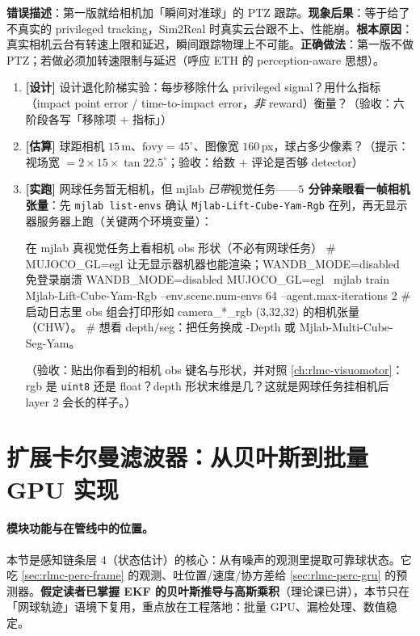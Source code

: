 \begin{pitfall}
\textbf{错误描述}：第一版就给相机加「瞬间对准球」的 PTZ 跟踪。\textbf{现象后果}：等于给了不真实的 privileged tracking，Sim2Real 时真实云台跟不上、性能崩。\textbf{根本原因}：真实相机云台有转速上限和延迟，瞬间跟踪物理上不可能。\textbf{正确做法}：第一版不做 PTZ；若做必须加转速限制与延迟（呼应 ETH 的 perception-aware 思想）。
\end{pitfall}

\begin{practice}[本节动手任务]
\begin{enumerate}
  \item \textbf{[设计]} 设计退化阶梯实验：每步移除什么 privileged signal？用什么指标（impact point error / time-to-impact error，\emph{非} reward）衡量？（验收：六阶段各写「移除项 $+$ 指标」）
  \item \textbf{[估算]} 球距相机 $15$\,m、$\mathrm{fovy}=45^\circ$、图像宽 $160$\,px，球占多少像素？（提示：视场宽 $=2\times 15\times\tan 22.5^\circ$；验收：给数 $+$ 评论是否够 detector）
  \item \textbf{[实跑]} 网球任务暂无相机，但 mjlab \emph{已带}视觉任务——\textbf{$5$ 分钟亲眼看一帧相机张量}：先 \verb|mjlab list-envs| 确认 \verb|Mjlab-Lift-Cube-Yam-Rgb| 在列，再无显示器服务器上跑（关键两个环境变量）：
\begin{codebox}[bash]{在 mjlab 真视觉任务上看相机 obs 形状（不必有网球任务）}
# MUJOCO_GL=egl 让无显示器机器也能渲染；WANDB_MODE=disabled 免登录崩溃
WANDB_MODE=disabled MUJOCO_GL=egl \
  mjlab train Mjlab-Lift-Cube-Yam-Rgb --env.scene.num-envs 64 --agent.max-iterations 2
# 启动日志里 obs 组会打印形如 camera_*_rgb (3,32,32) 的相机张量（CHW）。
# 想看 depth/seg：把任务换成 -Depth 或 Mjlab-Multi-Cube-Seg-Yam。
\end{codebox}
  （验收：贴出你看到的相机 obs 键名与形状，并对照 \cref{ch:rlmc-visuomotor}：rgb 是 \texttt{uint8} 还是 float？depth 形状末维是几？这就是网球任务挂相机后 layer 2 会长的样子。）
\end{enumerate}
\end{practice}

\section{扩展卡尔曼滤波器：从贝叶斯到批量 GPU 实现}
\label{sec:rlmc-perc-ekf}

\paragraph{模块功能与在管线中的位置。}本节是感知链条层 4（状态估计）的核心：从有噪声的观测里提取可靠球状态。它吃 \cref{sec:rlmc-perc-frame} 的观测、吐位置/速度/协方差给 \cref{sec:rlmc-perc-gru} 的预测器。\textbf{假定读者已掌握 EKF 的贝叶斯推导与高斯乘积}（理论课已讲），本节只在「网球轨迹」语境下复用，重点放在工程落地：批量 GPU、漏检处理、数值稳定。

